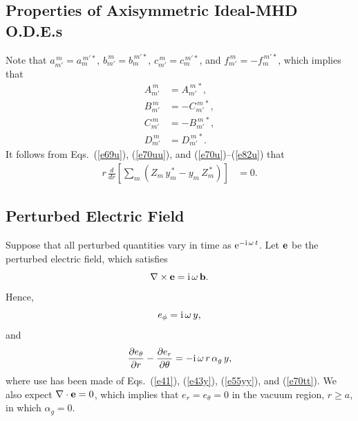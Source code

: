 \documentclass[12pt,prb,aps]{revtex4-1}
\begin{document}
\subsection{Properties of Axisymmetric Ideal-MHD O.D.E.s}
Note   that
$a_{m'}^{\,m} =a_{m}^{\,m'\ast}$, 
$b_{m'}^{\,m} =b_{m}^{\,m'\ast}$, 
$c_{m'}^{\,m} =c_{m}^{\,m'\ast}$, and 
$f_{m'}^{\,m} =-f_{m}^{\,m'\ast}$,
which implies that
\begin{align}\label{e70u}
A_{m'}^{\,m} &= A_{m'}^{\,m\,\ast},\\[0.5ex]
B_{m'}^{\,m} &= -C_{m'}^{\,m\,\ast},\\[0.5ex]
C_{m'}^{\,m} &= -B_{m'}^{\,m\,\ast},\\[0.5ex]
D_{m'}^{\,m} &= D_{m'}^{\,m\,\ast}.\label{e82u}
\end{align}
It follows from Eqs.~(\ref{e69u}), (\ref{e70uu}), and (\ref{e70u})--(\ref{e82u}) that 
\begin{align}\label{cons}
r\,\frac{d}{dr}\!\left[\sum_m (Z_m\,y_m^{\,\ast}- y_m\,Z_m^{\,\ast}) \right]&= 0.
\end{align}

\subsection{Perturbed Electric Field}
Suppose that all perturbed quantities vary in time as ${\rm e}^{-{\rm i}\,\omega\,t}$. 
Let ${\bf e}$ be the perturbed electric field, which satisfies 
\begin{equation}
\nabla\times {\bf e} = {\rm i}\,\omega\,{\bf b}.
\end{equation}
Hence,
\begin{equation}\label{ephi}
e_\phi = {\rm i}\,\omega\,y,
\end{equation}
and 
\begin{equation}\label{e81op}
\frac{\partial e_\theta}{\partial r} - \frac{\partial e_r}{\partial\theta} = - {\rm i}\,\omega\,r\,\alpha_g\,y,
\end{equation}
where use has been made of Eqs.~(\ref{e41}), (\ref{e43y}),  (\ref{e55yy}), and (\ref{e70tt}). 
We also expect $\nabla\cdot{\bf e} =0$, which implies that 
$e_r=e_\theta=0$ in the vacuum region, $r\geq a$, in which $\alpha_g=0$. 
\end{document}
